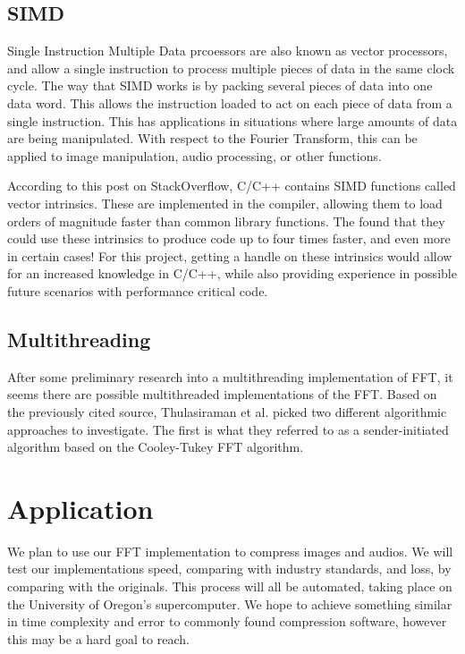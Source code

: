 \documentclass[12pt]{extarticle}
\begin{document}
\subsection*{SIMD}
    
    Single Instruction Multiple Data prcoessors are also known as vector processors, and allow a single instruction
    to process multiple pieces of data in the same clock cycle. The way that SIMD works is by packing several pieces of data
    into one data word. This allows the instruction loaded to act on each piece of data from a single instruction.
    This has applications in situations where large amounts of data are being manipulated. With respect to the Fourier Transform,
    this can be applied to image manipulation, audio processing, or other functions.

    According to this post\cite{Konstantin:2020} on StackOverflow, C/C++ contains SIMD functions called vector intrinsics.
    These are implemented in the compiler, allowing them to load orders of magnitude faster than common library functions. 
    The found that they could use these intrinsics to produce code up to four times faster, and even more in certain cases!
    For this project, getting a handle on these intrinsics would allow for an increased knowledge in C/C++, while also providing
    experience in possible future scenarios with performance critical code.

\subsection*{Multithreading}
    After some preliminary research into a multithreading implementation of FFT\cite{Thulasiraman:2021}, it seems there are
    possible multithreaded implementations of the FFT. Based on the previously cited source, Thulasiraman et al. picked two 
    different algorithmic approaches to investigate. The first is what they referred to as a sender-initiated algorithm based
    on the Cooley-Tukey FFT algorithm.

\section*{Application}
	We plan to use our FFT implementation to compress images and audios. 
	We will test our implementations speed, comparing with industry standards, and loss, by comparing with the originals. 
	This process will all be automated, taking place on the University of Oregon's supercomputer. 
	We hope to achieve something similar in time complexity and error to commonly found compression software, however this may be a hard goal to reach. 
	
\end{document}
